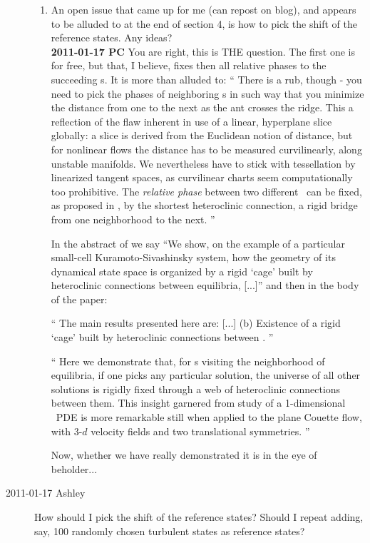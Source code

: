 \begin{description}
\begin{enumerate}
  \item An open issue that came up for me (can repost on blog), and
  appears to be alluded to at the end of section 4, is how to pick the
  shift of the reference states.  Any ideas?
    \\
  {\bf 2011-01-17 PC}
You are right, this is THE question.
The first one is for free, but that, I believe, fixes then all relative
phases to the succeeding {\template s}. It is more than alluded to:
``
There is a rub, though - you need to pick the phases of neighboring
{\template s} in such way that you minimize the distance from one to the
next as the ant crosses the ridge. This a reflection of the flaw inherent in use
of a linear, hyperplane slice globally: a slice is derived from the Euclidean
notion of distance, but for nonlinear flows the distance has to be
measured curvilinearly, along unstable
manifolds. We nevertheless have
to stick with tessellation by
linearized tangent spaces, as curvilinear charts seem computationally too
prohibitive. The {\em relative phase} between two
different \reqva\ can be fixed, as proposed in , by the
shortest heteroclinic connection, a rigid bridge from one
neighborhood to the next.
''

In the abstract of  we say
``We show,
on the example of a particular small-cell Kuramoto-Sivashinsky
system, how the geometry of its dynamical state space is
organized by a rigid `cage' built by heteroclinic connections
between equilibria, [...]'' and then in the body of the paper:

``
The main results presented here are: [...] (b)
Existence of a rigid `cage' built by heteroclinic connections
between \eqva.
''

``
Here we demonstrate that, for \rpo s visiting the
neighborhood of equilibria, if one picks any
particular solution, the universe of all other solutions is rigidly
fixed through a web of heteroclinic connections between them. This
insight garnered from study of a 1-dimensional \KS\ PDE is more
remarkable still when applied to the plane Couette flow,
with 3-$d$ velocity fields and two translational symmetries.
''

Now, whether we have really demonstrated it is in the eye of beholder...


\end{enumerate}

\item[2011-01-17 Ashley]
 How should I pick the shift of the reference states?
 Should I repeat adding, say, 100 randomly chosen turbulent states as reference states?


\end{description}
